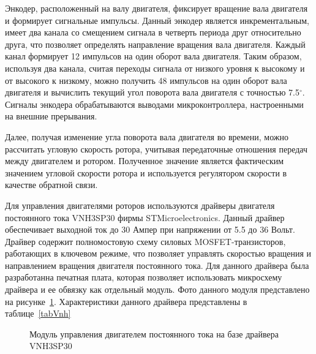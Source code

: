 Энкодер, расположенный на валу двигателя, фиксирует вращение вала двигателя и формирует сигнальные импульсы. Данный энкодер является инкрементальным, имеет два канала со смещением сигнала в четверть периода друг относительно друга, что позволяет определять направление вращения вала двигателя. Каждый канал формирует 12 импульсов на один оборот вала двигателя. Таким образом, используя два канала, считая переходы сигнала от низкого уровня к высокому и от высокого к низкому, можно получить 48 импульсов на один оборот вала двигателя и вычислить текущий угол поворота вала двигателя с точностью 7.5$ ^\circ$. Сигналы энкодера обрабатываются выводами микроконтроллера, настроенными на внешние прерывания.

Далее, получая изменение угла поворота вала двигателя во времени, можно рассчитать угловую скорость ротора, учитывая передаточные отношения передач между двигателем и ротором. Полученное значение является фактическим значением угловой скорости ротора и используется регулятором скорости в качестве обратной связи.

Для управления двигателями роторов используются драйверы двигателя постоянного тока VNH3SP30 фирмы STMicroelectronics. Данный драйвер обеспечивает выходной ток до 30 Ампер при напряжении от 5.5 до 36 Вольт. Драйвер содержит полномостовую схему силовых MOSFET-транзисторов, работающих в ключевом режиме, что позволяет управлять скоростью вращения и направлением вращения двигателя постоянного тока. Для данного драйвера была разработанна печатная плата, которая позволяет использовать микросхему драйвера и ее обвязку как отдельный модуль. Фото данного модуля представлено на рисунке~\ref{DriverPcb}. Характеристики данного драйвера представлены в таблице~\ref{tabVnh}

\begin{figure}[h]
	\begin{minipage}[h]{0.5\linewidth}
	\end{minipage}
	\hfill
	\begin{minipage}[h]{0.5\linewidth}
	\end{minipage}
	\vspace{2mm}
	\caption{Модуль управления двигателем постоянного тока на базе драйвера VNH3SP30}
	\label{DriverPcb}
\end{figure}

